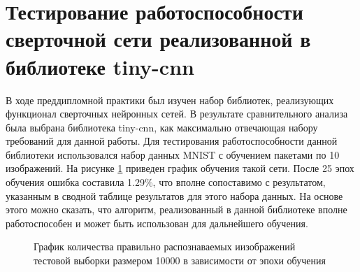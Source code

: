 \documentclass[utf8,usehyperref,14pt]{G7-32}
\begin{document}
\section{Тестирование работоспособности сверточной сети реализованной в библиотеке tiny-cnn}
В ходе преддипломной практики был изучен набор библиотек, реализующих функционал сверточных нейронных сетей. В результате сравнительного анализа была выбрана библиотека tiny-cnn, как максимально отвечающая набору требований для данной работы. Для тестирования работоспособности данной библиотеки использовался набор данных MNIST с обучением пакетами по 10 изображений. На рисунке \ref{tiny_cnn_learning} приведен график обучения такой сети. После 25 эпох обучения ошибка составила 1.29\%, что вполне сопоставимо с результатом, указанным в сводной таблице результатов для этого набора данных. На основе этого можно сказать, что алгоритм, реализованный в данной библиотеке вполне работоспособен и может быть использован для дальнейшего обучения.
\begin{figure}[H]
  \caption{График количества правильно распознаваемых иизображений тестовой выборки размером 10000 в зависимости от эпохи обучения}\label{tiny_cnn_learning}
\end{figure}
\end{document}
